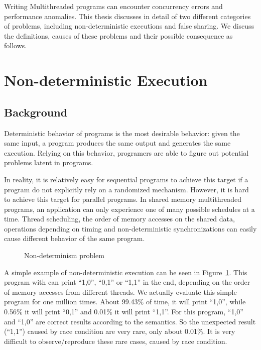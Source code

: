 \label{chapter:problems}

Writing Multithreaded programs can encounter concurrency errors and performance anomalies. This thesis discusses in detail of two different categories of problems, including non-deterministic executions and false sharing.  We discuss the definitions, causes of these problems and their possible consequence as follows.


\section{Non-deterministic Execution}
\label{sec:nondeterminism}

\subsection{Background}
Deterministic behavior of programs is the most desirable behavior: given the same input, a program
produces the same output and generates the same execution. Relying on this behavior, programers
are able to figure out potential problems latent in programs. 

In reality, it is relatively easy for sequential programs to achieve this target if a program do not explicitly rely on a randomized mechanism. 
However, it is hard to achieve this target for parallel programs. In shared memory multithreaded programs, an application can only experience one of many possible 
schedules at a time. Thread scheduling, the order of memory accesses on the shared data, operations depending on timing and non-deterministic synchronizations can easily cause different behavior of the same program.


\begin{figure}[!ht]
{\centering
\fbox{
\subfigure{}
\hspace{20pt}
\subfigure{}
\hspace{20pt}
\subfigure{}
}
\caption{Non-determinism problem 
\label{fig:nondeterminism}}
}
\end{figure}

A simple example of non-deterministic execution can be seen in Figure~\ref{fig:nondeterminism}. This program with \pthreads{} can print ``1,0'', ``0,1'' or ``1,1'' in the end, depending on the order of memory accesses from different threads. We actually evaluate this simple program for one million times. About 99.43\% of time, it will print ``1,0'', while 0.56\% it will print ``0,1'' and 0.01\% it will print ``1,1''. For this program, ``1,0'' and ``1,0'' are correct results according to the semantics. So the unexpected result (``1,1'') caused by race condition are very rare, only about 0.01\%.  
It is very difficult to observe/reproduce these rare cases, caused by race condition.

